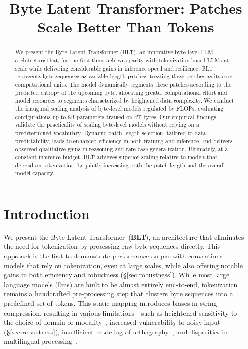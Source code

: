 \title{Byte Latent Transformer: Patches Scale Better Than Tokens}

\begin{abstract}
We present the Byte Latent Transformer ({\textsc BLT}), an innovative byte-level LLM architecture that, for the first time, achieves parity with tokenization-based LLMs at scale while delivering considerable gains in inference speed and resilience. {\textsc BLT} represents byte sequences as variable-length patches, treating these patches as its core computational units. The model dynamically segments these patches according to the predicted entropy of the upcoming byte, allocating greater computational effort and model resources to segments characterized by heightened data complexity. We conduct the inaugural scaling analysis of byte-level models regulated by FLOPs, evaluating configurations up to 8B parameters trained on 4T bytes. Our empirical findings validate the practicality of scaling byte-level models without relying on a predetermined vocabulary. Dynamic patch length selection, tailored to data predictability, leads to enhanced efficiency in both training and inference, and delivers observed qualitative gains in reasoning and rare-case generalization. Ultimately, at a constant inference budget, {\textsc BLT} achieves superior scaling relative to models that depend on tokenization, by jointly increasing both the patch length and the overall model capacity.
\end{abstract}

\section{Introduction}
\label{section:intro}

We present the Byte Latent Transformer~(\textbf{BLT}), an architecture that eliminates the need for tokenization by processing raw byte sequences directly. This approach is the first to demonstrate performance on par with conventional models that rely on tokenization, even at large scales, while also offering notable gains in both efficiency and robustness (\S\ref{sec:robustness}). While most large language models (llms) are built to be almost entirely end-to-end, tokenization remains a handcrafted pre-processing step that clusters byte sequences into a predefined set of tokens. This static mapping introduces biases in string compression, resulting in various limitations—such as heightened sensitivity to the choice of domain or modality~\citep{dagangetting}, increased vulnerability to noisy input (\S\ref{sec:robustness}), insufficient modeling of orthography~\citep{edman2024cute}, and disparities in multilingual processing~\citep{liang2023xlm,petrov2024language,limisiewicz2024myte}.

